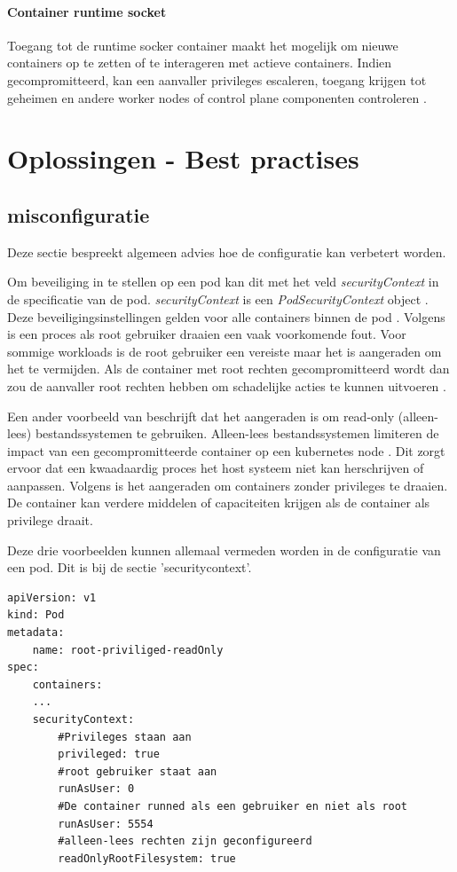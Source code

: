\paragraph{Container runtime socket}
Toegang tot de runtime socker container maakt het mogelijk om nieuwe containers op te zetten of te interageren met actieve containers. Indien gecompromitteerd, kan een aanvaller privileges escaleren, toegang krijgen tot geheimen en andere worker nodes of control plane componenten controleren \autocite{KubernetesDocs-2023}.

\section{Oplossingen - Best practises}

\subsection{misconfiguratie}
Deze sectie bespreekt algemeen advies hoe de configuratie kan verbetert worden.\newline

Om beveiliging in te stellen op een pod kan dit met het veld \textit{securityContext} in de specificatie van de pod. \textit{securityContext} is een \textit{PodSecurityContext} object \autocite{KubernetesDocs-2023}. 
Deze beveiligingsinstellingen gelden voor alle containers binnen de pod \autocite{KubernetesDocs-2023}. 
Volgens \textcite{OWASP-2023} is een proces als root gebruiker draaien een vaak voorkomende fout. Voor sommige workloads is de root gebruiker een vereiste maar het is aangeraden om het te vermijden. Als de container met root rechten gecompromitteerd wordt dan zou de aanvaller root rechten hebben om schadelijke acties te kunnen uitvoeren \autocite{OWASP-2023}.  \newline

Een ander voorbeeld van \textcite{OWASP-2023} beschrijft dat het aangeraden is om read-only (alleen-lees) bestandssystemen te gebruiken. Alleen-lees bestandssystemen limiteren de impact van een gecompromitteerde container op een kubernetes node \autocite{OWASP-2023}. Dit zorgt ervoor dat een kwaadaardig proces het host systeem niet kan herschrijven of aanpassen. Volgens \textcite{OWASP-2023} is het aangeraden om containers zonder privileges te draaien. De container kan verdere middelen of capaciteiten krijgen als de container als privilege draait. \newline

Deze drie voorbeelden kunnen allemaal vermeden worden in de configuratie van een pod. Dit is bij de sectie 'securitycontext'. 
\begin{lstlisting}
apiVersion: v1  
kind: Pod  
metadata:  
    name: root-priviliged-readOnly
spec:  
    containers:  
    ...
    securityContext:  
        #Privileges staan aan 
        privileged: true
        #root gebruiker staat aan
        runAsUser: 0
        #De container runned als een gebruiker en niet als root
        runAsUser: 5554
        #alleen-lees rechten zijn geconfigureerd
        readOnlyRootFilesystem: true
\end{lstlisting}


